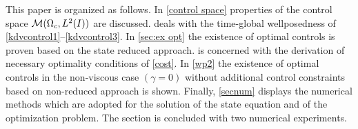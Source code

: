 {\color{red} This paper is organized as follows. In \cref{control space} properties of the control space $\mathcal{M}(\Omega_c, L^{2}(I))$ are discussed.  deals with the time-global wellposedness of \eqref{kdvcontrol1}--\eqref{kdvcontrol3}. In \cref{sec:ex opt} the existence of optimal controls is proven based on the state reduced approach.  is concerned with the derivation of necessary optimality conditions of \eqref{cost}. In \cref{wp2} the existence of optimal controls in the non-viscous case $(\gamma=0)$ without additional control constraints based on non-reduced approach is shown. Finally, \cref{secnum} displays the numerical methods which are adopted for the solution of the state equation and of the optimization problem. The section is concluded with two numerical experiments.}
